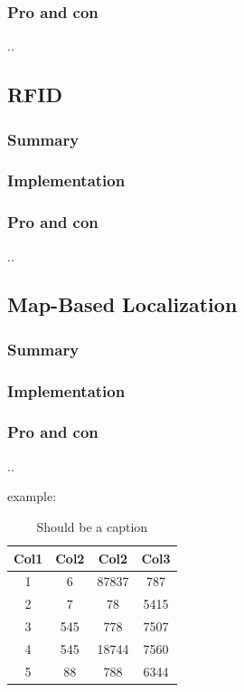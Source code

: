 \subsubsection*{Pro and con}
..

\subsection{RFID} %
\subsubsection*{Summary} 
\subsubsection*{Implementation}
\subsubsection*{Pro and con}
..

\subsection{Map-Based Localization} %
\subsubsection*{Summary} 
\subsubsection*{Implementation}
\subsubsection*{Pro and con}
..



example:
\begin{table}[h!]
\centering
 \begin{tabular}{||c c c c||} 
 \hline
 Col1 & Col2 & Col2 & Col3 \\ [0.5ex] 
 \hline\hline
 1 & 6 & 87837 & 787 \\ 
 2 & 7 & 78 & 5415 \\
 3 & 545 & 778 & 7507 \\
 4 & 545 & 18744 & 7560 \\
 5 & 88 & 788 & 6344 \\ [1ex] 
 \hline
 \end{tabular}
 \caption {Should be a caption}
\end{table}
